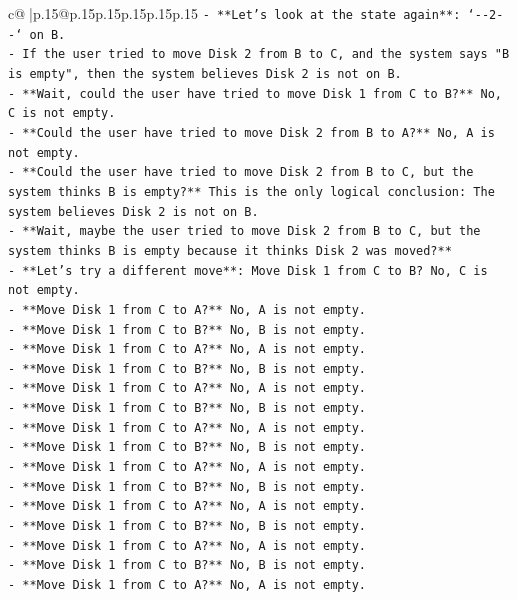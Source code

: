 \documentclass{article}
\begin{document}
{\begin{supertabular}{c@{$\;$}|p{.15\linewidth}@{}p{.15\linewidth}p{.15\linewidth}p{.15\linewidth}p{.15\linewidth}p{.15\linewidth}}
{{{\texttt{{-} **Let's look at the state again**: `{-}{-}2{-}{-}` on B.} \\
\texttt{{-} If the user tried to move Disk 2 from B to C, and the system says "B is empty", then the system believes Disk 2 is not on B.} \\
\texttt{{-} **Wait, could the user have tried to move Disk 1 from C to B?** No, C is not empty.} \\
\texttt{{-} **Could the user have tried to move Disk 2 from B to A?** No, A is not empty.} \\
\texttt{{-} **Could the user have tried to move Disk 2 from B to C, but the system thinks B is empty?** This is the only logical conclusion: The system believes Disk 2 is not on B.} \\
\texttt{{-} **Wait, maybe the user tried to move Disk 2 from B to C, but the system thinks B is empty because it thinks Disk 2 was moved?**} \\
\texttt{{-} **Let's try a different move**: Move Disk 1 from C to B? No, C is not empty.} \\
\texttt{{-} **Move Disk 1 from C to A?** No, A is not empty.} \\
\texttt{{-} **Move Disk 1 from C to B?** No, B is not empty.} \\
\texttt{{-} **Move Disk 1 from C to A?** No, A is not empty.} \\
\texttt{{-} **Move Disk 1 from C to B?** No, B is not empty.} \\
\texttt{{-} **Move Disk 1 from C to A?** No, A is not empty.} \\
\texttt{{-} **Move Disk 1 from C to B?** No, B is not empty.} \\
\texttt{{-} **Move Disk 1 from C to A?** No, A is not empty.} \\
\texttt{{-} **Move Disk 1 from C to B?** No, B is not empty.} \\
\texttt{{-} **Move Disk 1 from C to A?** No, A is not empty.} \\
\texttt{{-} **Move Disk 1 from C to B?** No, B is not empty.} \\
\texttt{{-} **Move Disk 1 from C to A?** No, A is not empty.} \\
\texttt{{-} **Move Disk 1 from C to B?** No, B is not empty.} \\
\texttt{{-} **Move Disk 1 from C to A?** No, A is not empty.} \\
\texttt{{-} **Move Disk 1 from C to B?** No, B is not empty.} \\
\texttt{{-} **Move Disk 1 from C to A?** No, A is not empty.} \\
}}}
\end{supertabular}}
\end{document}
